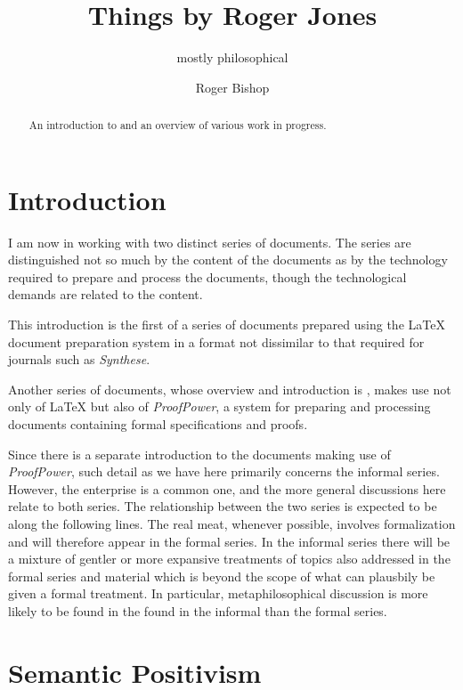 \documentclass[numreferences]{rbjk}
\begin{document}
                                                                                   
\begin{article}
\begin{opening}  
\title{Things by Roger Jones}
\subtitle{mostly philosophical}
\author{Roger Bishop }

\begin{abstract}
An introduction to and an overview of various work in progress.
\end{abstract}
\end{opening}

\section{Introduction}

I am now in working with two distinct series of documents.
The series are distinguished not so much by the content of the documents as by the technology required to prepare and process the documents, though the technological demands are related to the content.

This introduction is the first of a series of documents prepared using the {\LaTeX} document preparation system in a format not dissimilar to that required for journals such as {\it Synthese}.

Another series of documents, whose overview and introduction is \cite{rbjt000}, makes use not only of {\LaTeX} but also of {\it ProofPower}, a system for preparing and processing documents containing formal specifications and proofs.

Since there is a separate introduction \cite{rbjt000} to the documents making use of {\it ProofPower}, such detail as we have here primarily concerns the informal series.
However, the enterprise is a common one, and the more general discussions here relate to both series.
The relationship between the two series is expected to be along the following lines.
The real meat, whenever possible, involves formalization and will therefore appear in the formal series.
In the informal series there will be a mixture of gentler or more expansive treatments of topics also addressed in the formal series and material which is beyond the scope of what can plausbily be given a formal treatment.
In particular, metaphilosophical discussion is more likely to be found in the found in the informal than the formal series.

\section{Semantic Positivism}


\end{article}
\end{document}

